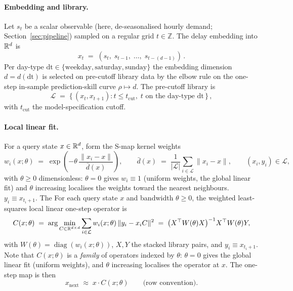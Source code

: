 \paragraph{Embedding and library.}
Let \(s_t\) be a scalar observable (here, de-seasonalised hourly
demand; Section~\ref{sec:pipeline}) sampled on a regular grid
\(t \in \mathbb{Z}\). The delay embedding into \(\mathbb{R}^{d}\) is
\begin{equation}
\label{eq:embed}
x_t \;=\; (s_t,\; s_{t-1},\; \ldots,\; s_{t-(d-1)}) \,.
\end{equation}
Per day-type \(\mathrm{dt} \in \{\mathrm{weekday},
\mathrm{saturday}, \mathrm{sunday}\}\) the embedding dimension
\(d = d(\mathrm{dt})\) is selected on pre-cutoff library data by the
elbow rule on the one-step in-sample prediction-skill curve
\(\rho \mapsto d\). The pre-cutoff library is
\begin{equation}
\label{eq:library}
\mathcal{L} \;=\; \{\,(x_t, x_{t+1}) : t \le t_{\mathrm{cut}},\;
t \text{ on the day-type } \mathrm{dt}\,\} \,,
\end{equation}
with \(t_{\mathrm{cut}}\) the model-specification cutoff.

\paragraph{Local linear fit.}
For a query state \(x \in \mathbb{R}^{d}\), form the S-map kernel
weights~\cite{Sugihara1994}
\begin{equation}
\label{eq:weights}
w_i(x;\theta) \;=\;
\exp\!\left(-\theta\,\frac{\lVert x_i - x \rVert}{\bar d(x)}\right),
\qquad
\bar d(x) \;=\; \frac{1}{|\mathcal{L}|}\sum_{i \in \mathcal{L}}
\lVert x_i - x \rVert,
\qquad (x_i, y_i) \in \mathcal{L},
\end{equation}
with \(\theta \ge 0\) dimensionless: \(\theta = 0\) gives
\(w_i \equiv 1\) (uniform weights, the global linear fit) and
\(\theta\) increasing localises the weights toward the nearest
neighbours. \(y_i \equiv x_{t_i + 1}\). The
For each query state \(x\) and bandwidth \(\theta \ge 0\), the
weighted least-squares local linear one-step operator is
\begin{equation}
\label{eq:wls}
C(x;\theta) \;=\;
\arg\min_{C \in \mathbb{R}^{d \times d}}
\sum_{i \in \mathcal{L}} w_i(x;\theta) \, \lVert y_i - x_i C \rVert^{2}
\;=\; \bigl(X^{\top} W(\theta) X\bigr)^{-1} X^{\top} W(\theta) Y,
\end{equation}
with \(W(\theta) = \operatorname{diag}(w_i(x;\theta))\), \(X, Y\) the
stacked library pairs, and \(y_i \equiv x_{t_i + 1}\). Note that
\(C(x;\theta)\) is a \emph{family} of operators indexed by \(\theta\):
\(\theta = 0\) gives the global linear fit (uniform weights), and
\(\theta\) increasing localises the operator at \(x\). The one-step
map is then
\begin{equation}
\label{eq:drift}
x_{\text{next}} \;\approx\; x \cdot C(x;\theta) \qquad
\text{(row convention).}
\end{equation}

